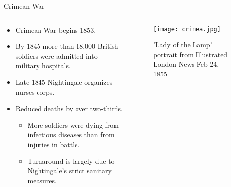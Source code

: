 \documentclass[10pt]{beamer}
\begin{document}
\begin{frame}{Crimean War}
  \begin{columns}[T]
    \begin{column}{.60\textwidth}
      \begin{center}
      \begin{itemize}
        \item Crimean War begins 1853.
        \item By 1845 more than 18,000 British soldiers were admitted into military hospitals.
        \item Late 1845 Nightingale organizes nurses corps.
        \item Reduced deaths by over two-thirds.
        \begin{itemize}
          \item More soldiers were dying from infectious diseases than from injuries in battle.
          \item Turnaround is largely due to Nightingale's strict sanitary measures.
        \end{itemize}
      \end{itemize}
    \end{center}
    \end{column}
    \begin{column}{.50\textwidth}
          \begin{figure}
            \vspace*{\fill}
            \begin{center}
          \texttt{[image: crimea.jpg]}
        \caption{ 'Lady of the Lamp' portrait from Illustrated London News Feb 24, 1855}
            \end{center}
            \vspace*{\fill}
          \end{figure}
        \end{column}
  \end{columns}
\end{frame}
\end{document}
